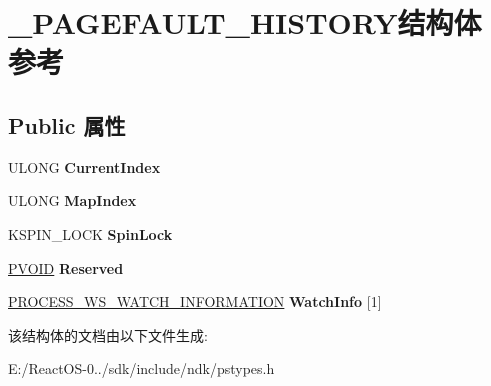 \hypertarget{struct___p_a_g_e_f_a_u_l_t___h_i_s_t_o_r_y}{}\section{\+\_\+\+P\+A\+G\+E\+F\+A\+U\+L\+T\+\_\+\+H\+I\+S\+T\+O\+R\+Y结构体 参考}
\label{struct___p_a_g_e_f_a_u_l_t___h_i_s_t_o_r_y}
\subsection*{Public 属性}
\begin{DoxyCompactItemize}
\item 
\mbox{\label{struct___p_a_g_e_f_a_u_l_t___h_i_s_t_o_r_y_addc86594e3b2f3f0f6bba91fd58d6134}} 
U\+L\+O\+NG {\bfseries Current\+Index}
\item 
\mbox{\label{struct___p_a_g_e_f_a_u_l_t___h_i_s_t_o_r_y_aadf4da58961a5ec824be367c7f910e3c}} 
U\+L\+O\+NG {\bfseries Map\+Index}
\item 
\mbox{\label{struct___p_a_g_e_f_a_u_l_t___h_i_s_t_o_r_y_ab785a81ff7074cf85d7f1e535cd445ce}} 
K\+S\+P\+I\+N\+\_\+\+L\+O\+CK {\bfseries Spin\+Lock}
\item 
\mbox{\label{struct___p_a_g_e_f_a_u_l_t___h_i_s_t_o_r_y_acb45a80af09c1b20fb8057b39e5d35db}} 
\hyperlink{interfacevoid}{P\+V\+O\+ID} {\bfseries Reserved}
\item 
\mbox{\label{struct___p_a_g_e_f_a_u_l_t___h_i_s_t_o_r_y_add56100a56d3d15614091c1e5cde3fe8}} 
\hyperlink{struct___p_r_o_c_e_s_s___w_s___w_a_t_c_h___i_n_f_o_r_m_a_t_i_o_n}{P\+R\+O\+C\+E\+S\+S\+\_\+\+W\+S\+\_\+\+W\+A\+T\+C\+H\+\_\+\+I\+N\+F\+O\+R\+M\+A\+T\+I\+ON} {\bfseries Watch\+Info} \mbox{[}1\mbox{]}
\end{DoxyCompactItemize}


该结构体的文档由以下文件生成\+:\begin{DoxyCompactItemize}
\item 
E\+:/\+React\+O\+S-\/0../sdk/include/ndk/pstypes.\+h\end{DoxyCompactItemize}
